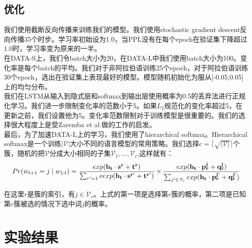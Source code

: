 \subsection{优化}
我们使用截断反向传播来训练我们的模型。我们使用stochastic gradient descent反向传播35个时步。学习率初始设为1.0，当PPL没有在每个epoch在验证集下降超过1.0时，学习率变为原来的一半。\\
在DATA-S上，我们令batch大小为20，在DATA-L中我们使用batch大小为100。变化率是每个batch的平均。我们对于非阿拉伯语训练25个epoch，对于阿拉伯语训练30个epoch，选出在验证集上表现最好的模型。模型随机初始化为服从[-0.05,0.05]上的均匀分布。\\
我们在LSTM从输入到隐式层和softmax到输出层使用概率为0.5的丢弃法进行正规化学习。我们进一步限制变化率的范数小于5。如果$L_2$规范化的变化率超过5，在更新之前，我们设置他为5。变化率范数限制对于训练模型是很重要的。我们的选择很大程度上是受Zaremba et al.做的工作的启发。\\
最后，为了加速DATA-L上的学习，我们使用了hierarchical softmax。Hierarchical softmax是一个训练$| \mathscr{V} |$大小不同的语言模型的常用策略。我们选择$c = \lceil \sqrt{| \mathscr{V} |}  \rceil$个簇，随机的把$\mathscr{V}$分成大小相同的子集$\mathscr{V}_1,...,\mathscr{V}_c$,这样就有：\\
\begin{equation}
Pr(w_{t+1} = j \mid w_{1:t}) = \frac{exp(\bf{h}_t \cdot \bf{s}^r + t^r)}{\sum_{r^\prime = 1}{c} exp(\bf{h}_t \cdot \bf{s}^{r^\prime} + t^{r^\prime})} \times \frac{exp(\bf{h}_t \cdot \bf{p}^j_r + q^j_r)}{\sum_{j^\prime \in \mathscr{V}_r}exp(\bf{h}_t \cdot \bf{p}_r^{j^\prime} + q_r^{j^\prime})}
\end{equation}

在这里$r$是簇的索引，有$j \in \mathscr{V}_r$。上式的第一项是选择第$r$簇的概率，第二项是已知第$r$簇被选的情况下选中词$j$的概率。

\section{实验结果}
